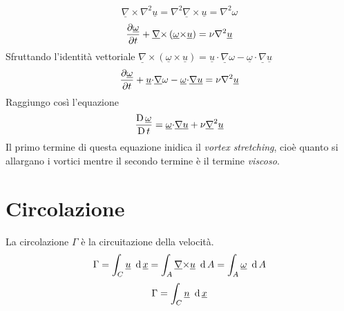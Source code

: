  \[
   \underline{\nabla}{\times}{\nabla}^2 \underline{u} = {\nabla}^2 \underline{\nabla}{\times}\underline{u}= {\nabla}^2 {\omega}
 \]
 \[
	 \frac{\partial\underline{{\omega}}}{\partial t} + \underline{\nabla}{\times} \left( \underline{{\omega}} {\times}\underline{u} \right) = {\nu}{\nabla}^2 \underline{u}
 \]
 Sfruttando l'identità vettoriale $ \underline{\nabla}{\times}\left( {\underline{\omega}}{\times} \underline{u} \right) = \underline{u}{\cdot}\underline{\nabla}{\omega}-{\underline{\omega}}{\cdot}\underline{\nabla}\underline{u} $
 \[
	 \frac{\partial\underline{{\omega}}}{\partial t} + \underline{u}{\cdot}\underline{\nabla}{\omega}- \underline{{\omega}}{\cdot}\underline{\nabla}\underline{u}= {\nu}{\nabla}^2 \underline{u}
 \]
 Raggiungo così l'equazione
 \begin{equation}
   \frac{\operatorname{D}\underline{{\omega}}}{\operatorname{D}t} = \underline{{\omega}} {\cdot} \underline{\nabla}\underline{u}+ {\nu}\underline{\nabla}^2 \underline{u}
 \end{equation}
 Il primo termine di questa equazione inidica il \emph{vortex stretching}, cioè quanto si allargano i vortici mentre il secondo termine è il termine \emph{viscoso}.

\section{Circolazione}
La circolazione $ {\Gamma} $ è la circuitazione della velocità.
\[
  {\Gamma} ={ \int_{C}^{} \underline{u} \,\,\operatorname{d} \underline{x}  }  = { \int_{A}^{} \underline{\nabla}{\times}\underline{u} \,\,\operatorname{d} A  } = \int_{A}^{} \underline{{\omega}} \,\,\operatorname{d} A
\]
\[
  {\Gamma} = \int_{C}^{} \underline{n} \,\,\operatorname{d} \underline{x}
\]
